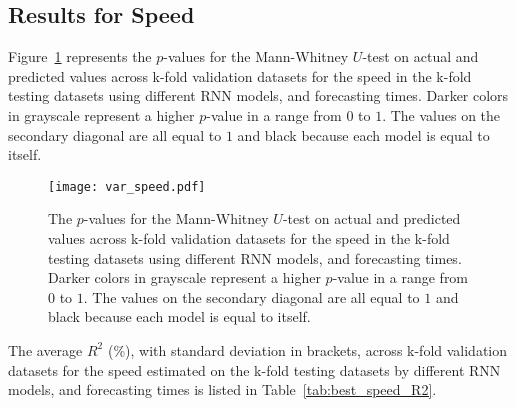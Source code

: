 \subsection{Results for Speed}

Figure~\ref{fig:var_speed} represents the $p$-values for the Mann-Whitney $U$-test on actual and predicted values across k-fold validation datasets for the speed in the k-fold testing datasets using different RNN models, and forecasting times. Darker colors in grayscale represent a higher $p$-value in a range from $0$ to $1$. The values on the secondary diagonal are all equal to $1$ and black because each model is equal to itself.

\begin{figure}[!ht]
	\centering
	\texttt{[image: var\_speed.pdf]}
	\caption{The $p$-values for the Mann-Whitney $U$-test on actual and predicted values across k-fold validation datasets for the speed in the k-fold testing datasets using different RNN models, and forecasting times. Darker colors in grayscale represent a higher $p$-value in a range from $0$ to $1$. The values on the secondary diagonal are all equal to $1$ and black because each model is equal to itself.}
	\label{fig:var_speed}
\end{figure}

The average $R^{2}$ (\%), with standard deviation in brackets, across k-fold validation datasets for the speed estimated on the k-fold testing datasets by different RNN models, and forecasting times is listed in Table~\ref{tab:best_speed_R2}.

\begin{table}[!ht]
	\centering
	\caption{The average $R^{2}$ (\%), with standard deviation in brackets, across k-fold validation datasets for the speed estimated on the k-fold testing datasets by different RNN models, and forecasting times.}
	\label{tab:best_speed_R2}
\end{table}


